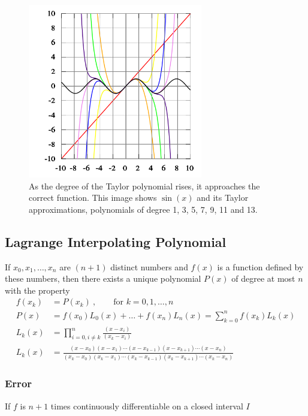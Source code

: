 \documentclass[12pt]{article}
\begin{document}
\begin{figure}[h!]
\begin{center}
\includegraphics[height=3in,clip]{TaylorSinEg}
\caption{As the degree of the Taylor polynomial rises, it approaches the correct function. This image shows $\sin(x)$ and its Taylor approximations, polynomials of degree 1, 3, 5, 7, 9, 11 and 13.}
\end{center}
\end{figure}

\subsection{Lagrange Interpolating Polynomial}
If $x_0, x_1,\dots, x_n$ are $(n+1)$ distinct numbers and $f(x)$ is a function defined by these numbers, then there exists a unique polynomial $P(x)$ of degree at most $n$ with the property
%
\begin{align}
f(x_k) &= P(x_k)\:, \qquad \text{for }k= 0, 1, \dots, n \\
%
P(x) &= f(x_0)L_0(x) + \dots + f(x_n)L_n(x) = \sum_{k=0}^{n}f(x_k)L_k(x) \\
%
L_k(x) &= \prod_{i=0, i \neq k}^n \frac{(x-x_i)}{(x_k-x_i)}\\
%
L_k(x) &= \frac{(x-x_0)(x-x_1)\cdots(x-x_{k-1})(x-x_{k+1})\cdots(x-x_n)}{(x_k-x_0)(x_k-x_1)\cdots(x_k-x_{k-1})(x_k-x_{k+1})\cdots(x_k-x_n)}
\end{align}


\subsubsection{Error}
If $f$ is $n+1$ times continuously differentiable on a closed interval $I$
\end{document}
